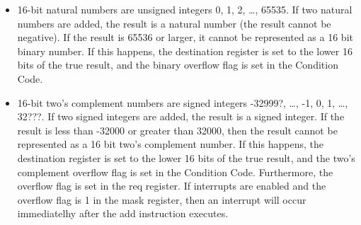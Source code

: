 \documentclass[11pt]{article}
\begin{document}
\begin{itemize}
\item 16-bit natural numbers are unsigned integers 0, 1, 2, \ldots{}, 65535.
If two natural numbers are added, the result is a natural number
(the result cannot be negative).  If the result is 65536 or larger,
it cannot be represented as a 16 bit binary number.  If this
happens, the destination register is set to the lower 16 bits of the
true result, and the binary overflow flag is set in the Condition Code.

\item 16-bit two's complement numbers are signed integers -32999?, \ldots{},
-1, 0, 1, \ldots{}, 32???.  If two signed integers are added, the result
is a signed integer.  If the result is less than -32000 or greater
than 32000, then the result cannot be represented as a 16 bit two's
complement number.  If this happens, the destination register is set
to the lower 16 bits of the true result, and the two's complement
overflow flag is set in the Condition Code.  Furthermore, the
overflow flag is set in the req register.  If interrupts are enabled
and the overflow flag is 1 in the mask register, then an interrupt
will occur immediatelhy after the add instruction executes.
\end{itemize}
\end{document}
